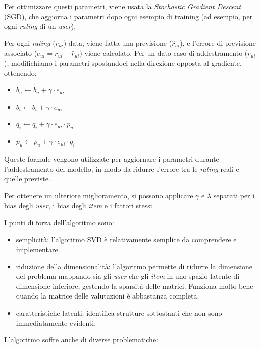 Per ottimizzare questi parametri, viene usata la \textit{Stochastic Gradient Descent} (SGD), che aggiorna i parametri dopo ogni  esempio di training (ad esempio, per ogni \textit{rating} di un \textit{user}).

Per ogni \textit{rating} ($r_{ui}$) data, viene fatta una previsione ($\hat{r}_{ui}$), e l'errore di previsione associato ($e_{ui} = r_{ui} - \hat{r}_{ui}$) viene calcolato. Per un dato caso di addestramento ($r_{ui}$), modifichiamo i parametri spostandoci nella
direzione opposta al gradiente, ottenendo:

\begin{itemize}
    \item $b_u \leftarrow b_u + \gamma \cdot e_{ui}$
    \item $b_i \leftarrow b_i + \gamma \cdot e_{ui}$
    \item $q_i \leftarrow q_i + \gamma \cdot e_{ui} \cdot p_u$
    \item $p_u \leftarrow p_u + \gamma \cdot e_{ui} \cdot q_i$
\end{itemize}

Queste formule vengono utilizzate per aggiornare i parametri durante l'addestramento del modello, in modo da ridurre l'errore tra le
\textit{rating} reali e quelle previste.

Per ottenere un ulteriore miglioramento, si possono applicare $\gamma$ e $\lambda$ separati per i bias degli \textit{user}, i bias degli
\textit{item} e i fattori stessi~\cite{SVD_optimized}.

I punti di forza dell'algoritmo sono:

\begin{itemize}
    \item semplicità: l'algoritmo SVD è relativamente semplice da comprendere e implementare.
    \item riduzione della dimensionalità: l'algoritmo permette di ridurre la dimensione del problema mappando sia gli \textit{user} che gli \textit{item} in uno spazio latente di dimensione inferiore, gestendo la sparsità delle matrici. Funziona molto bene quando la matrice delle valutazioni è abbastanza completa. 
    \item caratteristiche latenti: identifica strutture sottostanti che non sono immediatamente evidenti.
\end{itemize}

L'algoritmo soffre anche di diverse problematiche:

